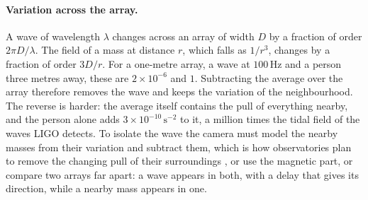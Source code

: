 \paragraph{Variation across the array.} A wave of wavelength $\lambda$ changes
across an array of width $D$ by a fraction of order $2\pi D/\lambda$. The field
of a mass at distance $r$, which falls as $1/r^{3}$, changes by a fraction of
order $3D/r$. For a one-metre array, a wave at $100\,\mathrm{Hz}$ and a person
three metres away, these are $2\times10^{-6}$ and $1$. Subtracting the
average over the array therefore removes the wave and keeps the variation of
the neighbourhood. The reverse is harder: the average itself contains the pull
of everything nearby, and the person alone adds $3\times10^{-10}\,\mathrm{s^{-2}}$
to it, a million times the tidal field of the waves LIGO detects. To isolate
the wave the camera must model the nearby masses from their variation and
subtract them, which is how observatories plan to remove the changing pull of
their surroundings \cite{Harms2019,Chaibi2016}, or use the magnetic part, or
compare two arrays far apart: a wave appears in both, with a delay that gives its direction, while a nearby mass
appears in one.


